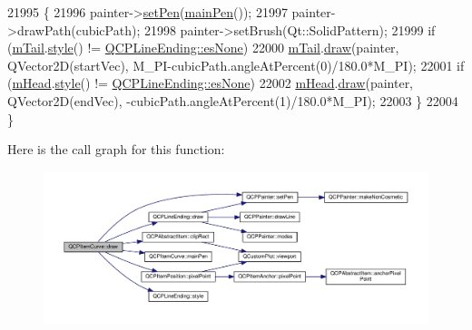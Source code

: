 \begin{DoxyCode}
21995   \{
21996     painter->\hyperlink{class_q_c_p_painter_af9c7a4cd1791403901f8c5b82a150195}{setPen}(\hyperlink{class_q_c_p_item_curve_a8089126f5645b6edfbaddea49d1e8390}{mainPen}());
21997     painter->drawPath(cubicPath);
21998     painter->setBrush(Qt::SolidPattern);
21999     \textcolor{keywordflow}{if} (\hyperlink{class_q_c_p_item_curve_af1dca285b97e3f5b892dab827a79f327}{mTail}.\hyperlink{class_q_c_p_line_ending_aea324dbfddbca9895ca8a3a968671299}{style}() != \hyperlink{class_q_c_p_line_ending_a5ef16e6876b4b74959c7261d8d4c2cd5aca12d500f50cd6871766801bac30fb03}{QCPLineEnding::esNone})
22000       \hyperlink{class_q_c_p_item_curve_af1dca285b97e3f5b892dab827a79f327}{mTail}.\hyperlink{class_q_c_p_line_ending_ac4b2fa94bd27b2f008b5fc090fcd7c0b}{draw}(painter, QVector2D(startVec), M\_PI-cubicPath.angleAtPercent(0)/180.0*M\_PI);
22001     \textcolor{keywordflow}{if} (\hyperlink{class_q_c_p_item_curve_af2cc26ff199570940dc96f5ec19a13f8}{mHead}.\hyperlink{class_q_c_p_line_ending_aea324dbfddbca9895ca8a3a968671299}{style}() != \hyperlink{class_q_c_p_line_ending_a5ef16e6876b4b74959c7261d8d4c2cd5aca12d500f50cd6871766801bac30fb03}{QCPLineEnding::esNone})
22002       \hyperlink{class_q_c_p_item_curve_af2cc26ff199570940dc96f5ec19a13f8}{mHead}.\hyperlink{class_q_c_p_line_ending_ac4b2fa94bd27b2f008b5fc090fcd7c0b}{draw}(painter, QVector2D(endVec), -cubicPath.angleAtPercent(1)/180.0*M\_PI);
22003   \}
22004 \}
\end{DoxyCode}


Here is the call graph for this function\+:\nopagebreak
\begin{figure}[H]
\begin{center}
\leavevmode
\includegraphics[width=350pt]{class_q_c_p_item_curve_a56cb5b72cd02db2eda598274a39839a9_cgraph}
\end{center}
\end{figure}


\hypertarget{class_q_c_p_item_curve_afc067f0d1e60cd04812f2c2c7fdf36c3}{}
